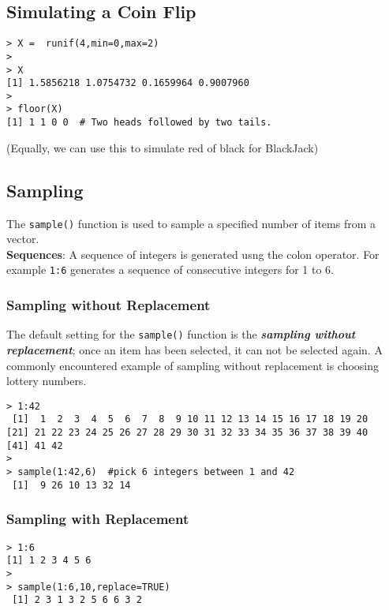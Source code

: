 \subsection{Simulating a Coin Flip}

\begin{framed}
\begin{verbatim}
> X =  runif(4,min=0,max=2)
>
> X
[1] 1.5856218 1.0754732 0.1659964 0.9007960
>
> floor(X)
[1] 1 1 0 0  # Two heads followed by two tails.
\end{verbatim}
\end{framed}


(Equally, we can use this to simulate red of black for BlackJack)
\subsection{Sampling}
The \texttt{sample()} function is used to sample a specified number
of items from a vector.\\

\bigskip
\noindent \textbf{Sequences}: A sequence of integers is generated usng the colon operator. For example \texttt{1:6} generates a sequence of consecutive integers for 1 to 6.

\subsubsection{Sampling without Replacement}
The default setting for the \texttt{sample()} function is the
\textbf{\textit{sampling without replacement}}; once an item has been selected, it can not be selected again. A commonly encountered example of sampling without replacement is choosing lottery numbers.
\begin{framed}
\begin{verbatim}
> 1:42
 [1]  1  2  3  4  5  6  7  8  9 10 11 12 13 14 15 16 17 18 19 20
[21] 21 22 23 24 25 26 27 28 29 30 31 32 33 34 35 36 37 38 39 40
[41] 41 42
> 
> sample(1:42,6)  #pick 6 integers between 1 and 42
 [1]  9 26 10 13 32 14
\end{verbatim}
\end{framed}


\subsubsection{Sampling with Replacement}


\begin{framed}
\begin{verbatim}
> 1:6
[1] 1 2 3 4 5 6
> 
> sample(1:6,10,replace=TRUE)
 [1] 2 3 1 3 2 5 6 6 3 2
\end{verbatim}
\end{framed}

